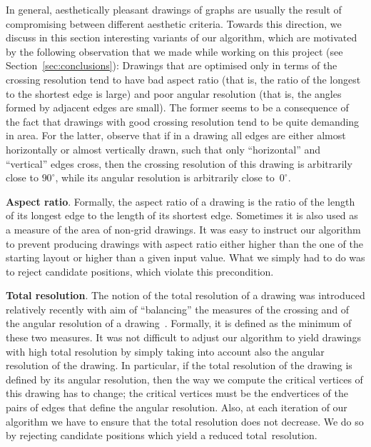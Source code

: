 \documentclass{comjnl}
\newcommand{\myparagraph}[1]{\medskip\noindent\textbf{#1}.}
\begin{document}
In general, aesthetically pleasant drawings of graphs are usually the result of compromising between different aesthetic criteria. Towards this direction, we discuss in this section interesting variants of our algorithm, which are motivated by the following observation that we made while working on this project (see Section~\ref{sec:conclusions}): Drawings that are optimised only in terms of the crossing resolution tend to have bad aspect ratio (that is, the ratio of the longest to the shortest edge is large) and poor angular resolution (that is, the angles formed by adjacent edges are small). The former seems to be a consequence of the fact that drawings with good crossing resolution tend to be quite demanding in area. For the latter, observe that if in a drawing all edges are either almost horizontally or almost vertically drawn, such that only ``horizontal'' and ``vertical'' edges cross, then the crossing resolution of this drawing is arbitrarily close to $90^\circ$, while its angular resolution is arbitrarily close to~$0^\circ$.

\myparagraph{Aspect ratio}
%
Formally, the aspect ratio of a drawing is the ratio of the length of its longest edge to the length of its shortest edge. Sometimes it is also used as a measure of the area of non-grid drawings. It was easy to instruct our algorithm to prevent producing drawings with aspect ratio either higher than the one of the starting layout or higher than a given input value. What we simply had to do was to reject candidate positions, which violate this precondition.

\myparagraph{Total resolution}
%
The notion of the total resolution of a drawing was introduced relatively recently with aim of ``balancing'' the measures of the crossing and of the angular resolution of a drawing~\cite{DBLP:journals/cj/ArgyriouBS13}. Formally, it is defined as the minimum of these two measures. It was not difficult to adjust our algorithm to yield drawings with high total resolution by simply taking into account also the angular resolution of the drawing. In particular, if the total resolution of the drawing is defined by its angular resolution, then the way we compute the critical vertices of this drawing has to change; the critical vertices must be the endvertices of the pairs of edges that define the angular resolution. Also, at each iteration of our algorithm we have to ensure that the total resolution does not decrease. We do so by rejecting candidate positions which yield a reduced total~resolution.
\end{document}
